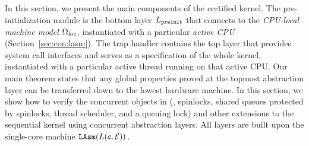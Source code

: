 
In this section, we present the main components of the certified {\cCTOS} kernel. 
The pre-initialization module is the bottom layer $L_{\texttt{preinit}}$
that connects to the
 \emph{CPU-local machine model} $\Omega_{\text{loc}}$, instantiated with a 
 particular \emph{active CPU} (\cf Section~\ref{sec:con:lasm}).
The trap handler contains the top layer that provides system call interfaces
and serves as a specification of the whole kernel,
instantiated with a particular active thread
running on that active CPU.
Our main theorem states that any global properties proved at the topmost
abstraction layer can be transferred down to the lowest hardware machine.
In this section, we show
how to verify 
the concurrent objects in \cCTOS{}
(\ie, spinlocks, shared queues protected by spinlocks,
thread scheduler, and a queuing lock)
and other extensions to the sequential
kernel \mCTOS{}
using concurrent abstraction layers.
All layers are built upon the single-core machine ${\texttt{LAsm}}{(L(c,\mathcal{E}))}$.

